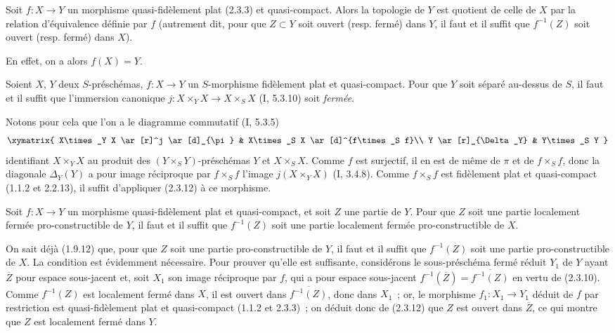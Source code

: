 \begin{corollary}[2.3.12]
\label{IV.2.3.12-fr}
Soit $f:X\to Y$ un morphisme quasi-fidèlement plat (2.3.3) et quasi-compact.
Alors la topologie de $Y$ est quotient de celle de $X$ par la relation
d'équivalence définie par $f$ (autrement dit, pour que $Z\subset Y$ soit
ouvert (resp. fermé) dans $Y$, il faut et il suffit que $f^{-1}(Z)$ soit
ouvert (resp. fermé) dans $X$).
\end{corollary}

En effet, on a alors $f(X)=Y$.

\begin{corollary}[2.3.13]
\label{IV.2.3.13-fr}
Soient $X$, $Y$ deux $S$-préschémas, $f:X\to Y$ un $S$-morphisme fidèlement
plat et quasi-compact. Pour que $Y$ soit séparé au-dessus de $S$, il faut et il
suffit que l'immersion canonique
$j:X\times_Y X\to X\times_S X$ (I, 5.3.10) soit \emph{fermée}.
\end{corollary}

Notons pour cela que l'on a le diagramme commutatif (I, 5.3.5)
\[
\xymatrix{
  X\times_Y X \ar[r]^j \ar[d]_{\pi} &
  X\times_S X \ar[d]^{f\times_S f}\\
  Y \ar[r]_{\Delta_Y} & Y\times_S Y
}
\]
identifiant $X\times_Y X$ au produit des $(Y\times_S Y)$-préschémas $Y$ et
$X\times_S X$. Comme $f$ est surjectif, il en est de même de $\pi$ et de
$f\times_S f$, donc la diagonale $\Delta_Y(Y)$ a pour image réciproque par
$f\times_S f$ l'image $j(X\times_Y X)$ (I, 3.4.8). Comme $f\times_S f$ est
fidèlement plat et quasi-compact (1.1.2 et 2.2.13), il suffit d'appliquer
(2.3.12) à ce morphisme.

\begin{corollary}[2.3.14]
\label{IV.2.3.14-fr}
Soit $f:X\to Y$ un morphisme quasi-fidèlement plat et quasi-compact, et soit
$Z$ une partie de $Y$. Pour que $Z$ soit une partie localement fermée
pro-constructible de $Y$, il faut et il suffit que $f^{-1}(Z)$ soit une partie
localement fermée pro-constructible de $X$.
\end{corollary}

On sait déjà (1.9.12) que, pour que $Z$ soit une partie pro-constructible de
$Y$, il faut et il suffit que $f^{-1}(Z)$ soit une partie pro-constructible de
$X$. La condition est évidemment nécessaire. Pour prouver qu'elle est
suffisante, considérons le sous-préschéma fermé réduit $Y_1$ de $Y$ ayant
$\overline Z$ pour espace sous-jacent et, soit $X_1$ son image réciproque par
$f$, qui a pour espace sous-jacent
$f^{-1}(\overline Z)=\overline{f^{-1}(Z)}$ en vertu de (2.3.10). Comme
$f^{-1}(Z)$ est localement fermé dans $X$, il est ouvert dans
$\overline{f^{-1}(Z)}$, donc dans $X_1$~; or, le morphisme $f_1:X_1\to Y_1$
déduit de $f$ par restriction est quasi-fidèlement plat et quasi-compact
(1.1.2 et 2.3.3)~; on déduit donc de (2.3.12) que $Z$ est ouvert dans
$\overline Z$, ce qui montre que $Z$ est localement fermé dans $Y$.

